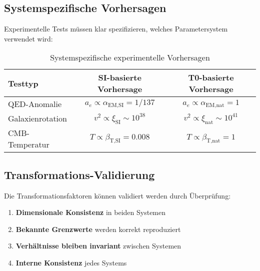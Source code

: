 \documentclass[12pt,a4paper]{article}
\newcommand{\xipar}{\xi}
\newcommand{\alphaEMSI}{\alpha_{\text{EM,SI}}}
\newcommand{\alphaEMnat}{\alpha_{\text{EM,nat}}}
\newcommand{\betaTSI}{\beta_{\text{T,SI}}}
\newcommand{\betaTnat}{\beta_{\text{T,nat}}}
\begin{document}
	\subsection{Systemspezifische Vorhersagen}
	\label{subsec:systemspezifische_vorhersagen}
	
	Experimentelle Tests müssen klar spezifizieren, welches Parametersystem verwendet wird:
	
	\begin{table}[htbp]
		\centering
		\begin{tabular}{lcc}
			\toprule
			\textbf{Testtyp} & \textbf{SI-basierte Vorhersage} & \textbf{T0-basierte Vorhersage} \\
			\midrule
			QED-Anomalie & $a_e \propto \alphaEMSI = 1/137$ & $a_e \propto \alphaEMnat = 1$ \\
			Galaxienrotation & $v^2 \propto \xipar_{\text{SI}} \sim 10^{38}$ & $v^2 \propto \xipar_{\text{nat}} \sim 10^{41}$ \\
			CMB-Temperatur & $T \propto \betaTSI = 0.008$ & $T \propto \betaTnat = 1$ \\
			\bottomrule
		\end{tabular}
		\caption{Systemspezifische experimentelle Vorhersagen}
		\label{tab:system_vorhersagen}
	\end{table}
	
	\subsection{Transformations-Validierung}
	\label{subsec:transformations_validierung}
	
	Die Transformationsfaktoren können validiert werden durch Überprüfung:
	
	\begin{enumerate}
		\item \textbf{Dimensionale Konsistenz} in beiden Systemen
		\item \textbf{Bekannte Grenzwerte} werden korrekt reproduziert
		\item \textbf{Verhältnisse bleiben invariant} zwischen Systemen
		\item \textbf{Interne Konsistenz} jedes Systems
	\end{enumerate}
	

	
\end{document}
